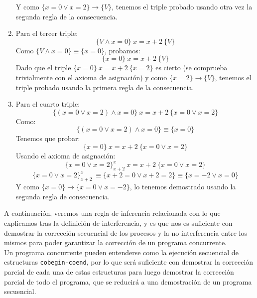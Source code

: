 \begin{ejemplo}
\begin{enumerate}
\begin{equation*}
            \end{equation*}
            Y como $\{x=0 \lor x=2\} \rightarrow \{V\}$, tenemos el triple probado usando otra vez la segunda regla de la consecuencia.
        \item Para el tercer triple:
            \begin{equation*}
                \{V \land x=0\}\ x=x+2\ \{V\}
            \end{equation*}
            Como $\{V \land x=0\}\equiv \{x=0\}$, probamos:
            \begin{equation*}
                \{x=0\}\ x=x+2\ \{V\}
            \end{equation*}
            Dado que el triple $\{x=0\}\ x=x+2\ \{x=2\}$ es cierto (se comprueba trivialmente con el axioma de asignación) y como $\{x=2\}\rightarrow\{V\}$, tenemos el triple probado usando la primera regla de la consecuencia.
        \item Para el cuarto triple:
            \begin{equation*}
                \{(x=0 \lor x=2)\land x=0\}\ x=x+2\ \{x=0 \lor x=2\}
            \end{equation*}
            Como:
            \begin{equation*}
                \{(x=0 \lor x=2) \land x=0\} \equiv \{x=0\}
            \end{equation*}
            Tenemos que probar:
            \begin{equation*}
                \{x=0\}\ x=x+2\ \{x=0 \lor x=2\}
            \end{equation*}
            Usando el axioma de asignación:
            \begin{equation*}
                \{x=0 \lor x=2\}^x_{x+2}\ x=x+2\ \{x=0 \lor x=2\}
            \end{equation*}
            \begin{equation*}
                \{x=0 \lor x=2\}^x_{x+2}\ \equiv \{x+2=0 \lor x+2=2\} \equiv \{x=-2 \lor x=0\}
            \end{equation*}
            Y como $\{x=0\}\rightarrow\{x=0 \lor x=-2\}$, lo tenemos demostrado usando la segunda regla de consecuencia.
    \end{enumerate}
    
\end{ejemplo}

A continuación, veremos una regla de inferencia relacionada con lo que explicamos tras la definición de interferencia, y es que nos es suficiente con demostrar la corrección secuencial de los procesos y la no interferencia entre los mismos para poder garantizar la corrección de un programa concurrente.\\
Un programa concurrente pueden entenderse como la ejecución secuencial de estructuras \texttt{cobegin-coend}, por lo que será suficiente con demostrar la corrección parcial de cada una de estas estructuras para luego demostrar la corrección parcial de todo el programa, que se reducirá a una demostración de un programa secuencial.

